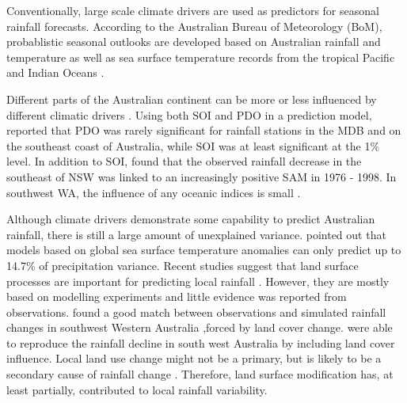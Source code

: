\documentclass[onecolumn,referee]{svjour3}
\begin{document}
Conventionally, large scale climate drivers are used as predictors for seasonal rainfall forecasts. According to the Australian Bureau of Meteorology (BoM), probablistic seasonal outlooks are developed based on Australian rainfall and temperature as well as sea surface temperature records from the tropical Pacific and Indian Oceans \citep{BoM2012c}. 

Different parts of the Australian continent can be more or less influenced by different climatic drivers \citep{Mla2008}. Using both SOI and PDO in a prediction model, \citet{Kamruzzaman2011} reported that PDO was rarely significant for rainfall stations in the MDB and on the southeast coast of Australia, while SOI was at least significant at the 1\% level. In addition to SOI, \citet{Speer2011} found that the observed rainfall decrease in the southeast of NSW was linked to an increasingly positive SAM in 1976 - 1998. In southwest WA, the influence of any oceanic indices is small \citep{Smith2012}.

Although climate drivers demonstrate some capability to predict Australian rainfall, there is still a large amount of unexplained variance. \citet{Westra2010} pointed out that models based on global sea surface temperature anomalies can only predict up to 14.7\% of precipitation variance. Recent studies suggest that land surface processes are important for predicting local rainfall \citep[e.g.][]{Ma2011,Zeng2012, pitman_scale_2016, saha_investigating_2016}. However, they are mostly based on modelling experiments and little evidence was reported from observations. \citet{Pitman2004} found a good match between observations and simulated rainfall changes in southwest Western Australia ,forced by land cover change. \citet{Timbal2006} were able to reproduce the rainfall decline in south west Australia by including land cover influence. Local land use change might not be a primary, but is likely to be a secondary cause of rainfall change \citep{Nicholls2006}. Therefore, land surface modification has, at least partially, contributed to local rainfall variability.
\end{document}
